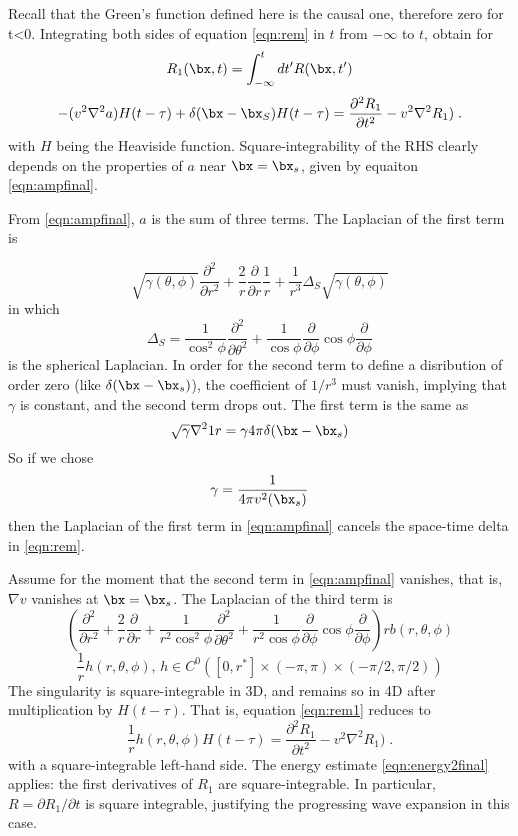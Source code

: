 Recall that the Green's function defined here is the causal one,
therefore zero for t<0. Integrating both sides of equation
\ref{eqn:rem} in $t$ from $-\infty$ to $t$, obtain for 
\begin{equation}
\label{eqn:R1def}
R_{1}(\bx,t) = \int_{-\infty}^t dt' R(\bx,t')
\end{equation}
\begin{equation}
\label{eqn:rem1}
-(v^2\nabla^2 a) H(t-\tau) + \delta(\bx-\bx_S)H(t-\tau)
   = \frac {\partial ^2 R_1}{\partial t^2} -  v^2 \nabla^2 R_1) \;. 
\end{equation}
with $H$ being the Heaviside function. Square-integrability of the RHS
clearly depends on the properties of $a$ near $\bx=\bx_s$, given by
equaiton \ref{eqn:ampfinal}.

From \ref{eqn:ampfinal}, $a$ is the sum of three terms. The
Laplacian of  the first term is 

\[
\sqrt{\gamma(\theta,\phi)}  \frac{\partial^2}{\partial r^2} + \frac{2}{r}\frac{\partial}{\partial 
  r} \frac{1}{r} + \frac{1}{r^3} \Delta_S\sqrt{\gamma(\theta,\phi)} 
\]
in which 
\[
\Delta_S = \frac{1}{\cos^2 \phi}\frac{\partial^2}{\partial \theta^2} +
\frac{1}{\cos \phi} \frac{\partial}{\partial \phi}\cos \phi 
\frac{\partial}{\partial \phi}
\]
is the spherical Laplacian. In order for the second term to define a
disribution of order zero (like $\delta(\bx-\bx_s)$), the coefficient
of $1/r^3$ must vanish, implying that $\gamma$ is constant, and the
second term drops out. The first
term is the same as 
\[
\sqrt{\gamma} \nabla^2 {1}{r} = \gamma 4 \pi \delta(\bx-\bx_s)
\]
So if we chose 
\[
\gamma = \frac{1}{4 \pi v^2(\bx_s)}
\]
then the Laplacian of the first term in \ref{eqn:ampfinal} cancels the
space-time delta in \ref{eqn:rem}.

Assume for the moment that the second term in \ref{eqn:ampfinal}
vanishes, that is, $\nabla v$ vanishes at $\bx=\bx_s$. The Laplacian
of the third term is
\[
\left(\frac{\partial^2}{\partial r^2} + \frac{2}{r}\frac{\partial}{\partial 
  r} + \frac{1}{r^2 \cos^2 \phi}\frac{\partial^2}{\partial \theta^2} +
\frac{1}{r^2 \cos \phi} \frac{\partial}{\partial \phi}\cos \phi 
\frac{\partial}{\partial \phi}\right) r b(r,\theta,\phi)
\]
\[
\frac{1}{r}h(r,\theta,\phi), \, h \in C^0([0,r^*] \times (-\pi,\pi)
\times (-\pi/2,\pi/2))
\]
The singularity is square-integrable in 3D, and remains so in 4D after
multiplication by $H(t-\tau)$. That is, equation \ref{eqn:rem1}
reduces to 
\begin{equation}
\label{eqn:rem1r}
\frac{1}{r}h(r,\theta,\phi) H(t-\tau)
   = \frac {\partial ^2 R_1}{\partial t^2} -  v^2 \nabla^2 R_1) \;. 
\end{equation}
with a square-integrable left-hand side. The energy estimate
\ref{eqn:energy2final} applies: the first derivatives of $R_1$ are
square-integrable. In particular, $R = \partial R_1/\partial t$ is
square integrable, justifying the progressing wave expansion in this
case.

